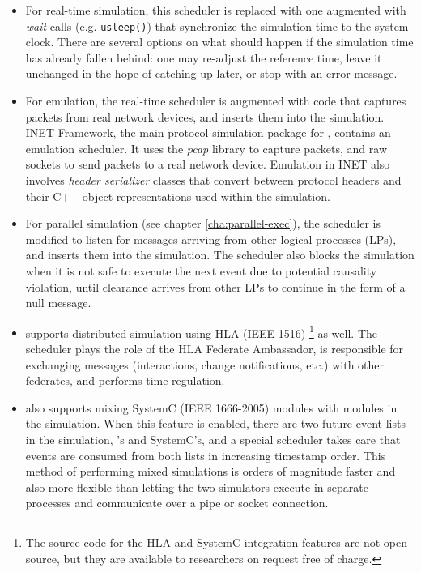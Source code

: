 \begin{itemize}
\item For real-time simulation, this scheduler is replaced with one augmented
    with \textit{wait} calls (e.g. \texttt{usleep()}) that synchronize the
    simulation time to the system clock. There are several options on what
    should happen if the simulation time has already fallen behind: one may
    re-adjust the reference time, leave it unchanged in the hope of catching up
    later, or stop with an error message.

\item For emulation, the real-time scheduler is augmented with code that captures
    packets from real network devices, and inserts them into the simulation.
    INET Framework, the main protocol simulation package for {\opp}, contains
    an emulation scheduler. It uses the \textit{pcap} library to capture
    packets, and raw sockets to send packets to a real network device.
    Emulation in INET also involves \textit{header serializer} classes that
    convert between protocol headers and their C++ object representations used
    within the simulation.

\item For parallel simulation (see chapter \ref{cha:parallel-exec}), the
    scheduler is modified to listen for messages arriving from other logical
    processes (LPs), and inserts them into the simulation. The scheduler also
    blocks the simulation when it is not safe to execute the next event due to
    potential causality violation, until clearance arrives from other LPs to
    continue in the form of a null message.

\item {\opp} supports distributed simulation using HLA (IEEE 1516) \footnote{The
    source code for the HLA and SystemC integration features are not open
    source, but they are available to researchers on request free of charge.}
    as well. The scheduler plays the role of the HLA Federate Ambassador, is
    responsible for exchanging messages (interactions, change notifications,
    etc.) with other federates, and performs time regulation.

\item {\opp} also supports mixing SystemC (IEEE 1666-2005) modules with {\opp}
    modules in the simulation. When this feature is enabled, there are two
    future event lists in the simulation, {\opp}'s and SystemC's, and a
    special scheduler takes care that events are consumed from both lists in
    increasing timestamp order. This method of performing mixed simulations is
    orders of magnitude faster and also more flexible than letting the two
    simulators execute in separate processes and communicate over a pipe or
    socket connection.
\end{itemize}

